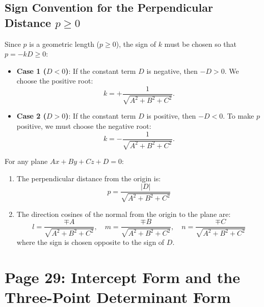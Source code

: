 \subsection{Sign Convention for the Perpendicular Distance $p \ge 0$}
Since $p$ is a geometric length ($p \ge 0$), the sign of $k$ must be chosen so that $p = -kD \ge 0$:
\begin{itemize}
    \item \textbf{Case 1 ($D < 0$)}: If the constant term $D$ is negative, then $-D > 0$. We choose the positive root:
    \begin{equation}
        k = +\frac{1}{\sqrt{A^2 + B^2 + C^2}}.
    \end{equation}
    \item \textbf{Case 2 ($D > 0$)}: If the constant term $D$ is positive, then $-D < 0$. To make $p$ positive, we must choose the negative root:
    \begin{equation}
        k = -\frac{1}{\sqrt{A^2 + B^2 + C^2}}.
    \end{equation}
\end{itemize}

\begin{theorembox}
For any plane $Ax + By + Cz + D = 0$:
\begin{enumerate}
    \item The perpendicular distance from the origin is:
    \begin{equation}
        \boxed{p = \frac{|D|}{\sqrt{A^2 + B^2 + C^2}}}
    \end{equation}
    \item The direction cosines of the normal from the origin to the plane are:
    \begin{equation}
        \boxed{l = \frac{\mp A}{\sqrt{A^2 + B^2 + C^2}}, \quad m = \frac{\mp B}{\sqrt{A^2 + B^2 + C^2}}, \quad n = \frac{\mp C}{\sqrt{A^2 + B^2 + C^2}}}
    \end{equation}
    where the sign is chosen opposite to the sign of $D$.
\end{enumerate}
\end{theorembox}

\section{Page 29: Intercept Form and the Three-Point Determinant Form}
\label{sec:page29}

